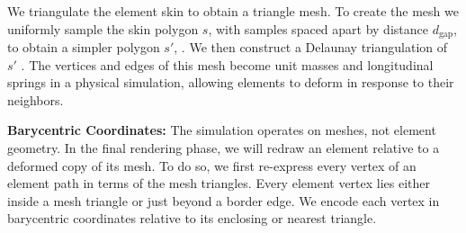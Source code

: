 We triangulate the element skin to obtain a triangle mesh.
To create the mesh we uniformly sample the skin polygon $s$, with samples
spaced apart by distance $d_\mathrm{gap}$,
to obtain a simpler polygon $s'$, .
We then construct a Delaunay triangulation of $s'$ .
The vertices and edges of this mesh become unit 
masses and longitudinal
springs in a physical simulation, allowing elements to deform in response to
their neighbors.  


\textbf{Barycentric Coordinates:}
The simulation operates on meshes, not element geometry.  In the final
rendering phase, we will redraw an element relative to a deformed copy of
its mesh.  To do so, we first re-express every vertex of an element path in 
terms of the mesh triangles.  Every element vertex lies either inside a mesh
triangle or just beyond a border edge.  We encode each vertex in barycentric
coordinates relative to its enclosing or nearest triangle.

